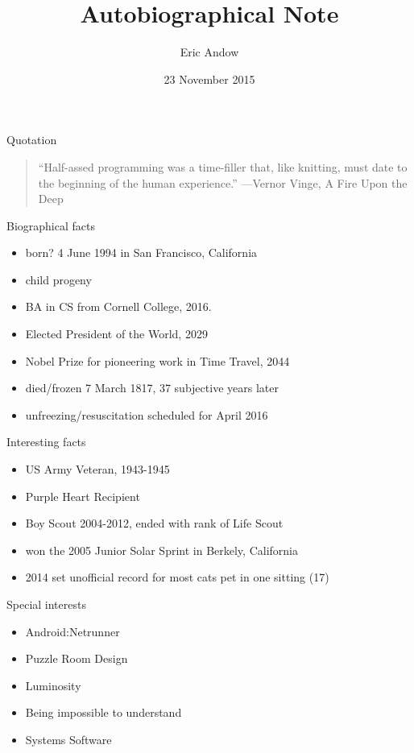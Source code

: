 \documentclass{beamer}
\title{Autobiographical Note}
\author{Eric Andow}
\institute{Cornell College}
\date{23 November 2015}
\begin{document}
\begin{frame}
  \titlepage
\end{frame}

\begin{frame}{Quotation}
\begin{quotation}
\noindent
``Half-assed programming was a time-filler that, like knitting, must date to the beginning of the human experience.''
  \flushright
  ---Vernor Vinge, A Fire Upon the Deep
  \end{quotation}
\end{frame}

\begin{frame}{Biographical facts}
\begin{itemize}
  \item born? 4 June 1994 in San Francisco, California
  \item child progeny
  \item BA in CS from Cornell College, 2016.
  \item Elected President of the World, 2029
  \item Nobel Prize for pioneering work in Time Travel, 2044
  \item died/frozen 7 March 1817, 37 subjective years later
  \item unfreezing/resuscitation scheduled for April 2016
  \end{itemize}
\end{frame}

\begin{frame}{Interesting facts}
\begin{itemize}
  \item US Army Veteran, 1943-1945
  \item Purple Heart Recipient
  \item Boy Scout 2004-2012, ended with rank of Life Scout
  \item won the 2005 Junior Solar Sprint in Berkely, California
  \item 2014 set unofficial record for most cats pet in one sitting (17)
  \end{itemize}
\end{frame}

\begin{frame}{Special interests}
\begin{itemize}
  \item Android:Netrunner
  \item Puzzle Room Design
  \item Luminosity
  \item Being impossible to understand
  \item Systems Software
  \end{itemize}
\end{frame}
\end{document}
